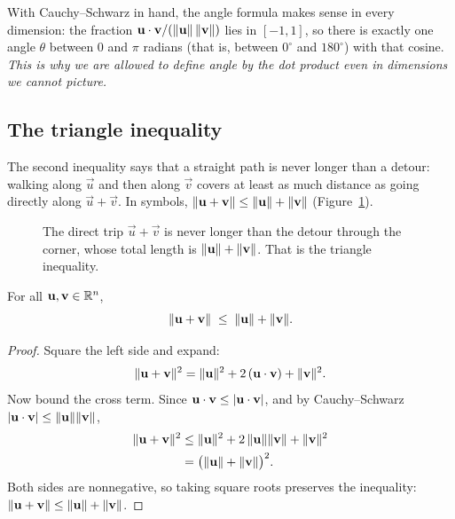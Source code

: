 With Cauchy--Schwarz in hand, the angle formula makes sense in every dimension: the
fraction $\mathbf{u}\cdot\mathbf{v}/(\lVert\mathbf{u}\rVert\,\lVert\mathbf{v}\rVert)$ lies in $[-1,1]$, so
there is exactly one angle $\theta$ between $0$ and $\pi$ radians (that is, between
$0^\circ$ and $180^\circ$) with that cosine. \emph{This is why we are allowed to
define angle by the dot product even in dimensions we cannot picture.}

\subsection{The triangle inequality}

The second inequality says that a straight path is never longer than a detour:
walking along $\vec u$ and then along $\vec v$ covers at least as much distance as
going directly along $\vec u+\vec v$. In symbols,
$\lVert\mathbf{u} + \mathbf{v}\rVert \le \lVert\mathbf{u}\rVert + \lVert\mathbf{v}\rVert$
(Figure~\ref{ch04:triangle}).

\begin{figure}[htbp]
\centering
{}
\caption{The direct trip $\vec u+\vec v$ is never longer than the detour
through the corner, whose total length is $\lVert\mathbf{u}\rVert+\lVert\mathbf{v}\rVert$. That is the
triangle inequality.}
\label{ch04:triangle}
\end{figure}

\begin{theorem}\label{ch04:tri}
For all $\mathbf{u},\mathbf{v}\in\mathbb{R}^n$,
\[
  \lVert\mathbf{u} + \mathbf{v}\rVert \;\le\; \lVert\mathbf{u}\rVert + \lVert\mathbf{v}\rVert.
\]
\end{theorem}

\begin{proof}
Square the left side and expand:
\[
  \lVert\mathbf{u}+\mathbf{v}\rVert^2
   = \lVert\mathbf{u}\rVert^2 + 2\,(\mathbf{u}\cdot\mathbf{v}) + \lVert\mathbf{v}\rVert^2.
\]
Now bound the cross term. Since $\mathbf{u}\cdot\mathbf{v} \le \lvert\mathbf{u}\cdot\mathbf{v}\rvert$, and
by Cauchy--Schwarz $\lvert\mathbf{u}\cdot\mathbf{v}\rvert\le\lVert\mathbf{u}\rVert\lVert\mathbf{v}\rVert$,
\begin{align*}
  \lVert\mathbf{u}+\mathbf{v}\rVert^2
   &\le \lVert\mathbf{u}\rVert^2 + 2\,\lVert\mathbf{u}\rVert\lVert\mathbf{v}\rVert + \lVert\mathbf{v}\rVert^2\\
   &= \bigl(\lVert\mathbf{u}\rVert + \lVert\mathbf{v}\rVert\bigr)^2.
\end{align*}
Both sides are nonnegative, so taking square roots preserves the inequality:
$\lVert\mathbf{u}+\mathbf{v}\rVert\le\lVert\mathbf{u}\rVert+\lVert\mathbf{v}\rVert$.
\end{proof}

